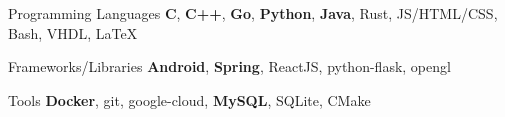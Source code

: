 

\begin{cvskills}

  \cvskill
    {Programming Languages} %
    {\textbf{C}, \textbf{C++}, \textbf{Go}, \textbf{Python}, \textbf{Java}, Rust, JS/HTML/CSS, Bash, VHDL, \LaTeX} %

  \cvskill
    {Frameworks/Libraries} %
    {\textbf{Android}, \textbf{Spring}, ReactJS, python-flask, opengl} %

  \cvskill
    {Tools} %
    {\textbf{Docker}, git, google-cloud, \textbf{MySQL}, SQLite, CMake} %

\end{cvskills}
